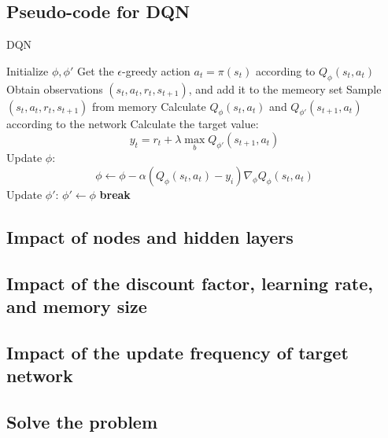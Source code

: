 \documentclass{article}
\begin{document}
\subsection{Pseudo-code for DQN}

\begin{algorithm}[h]
  \caption{DQN}
  \begin{algorithmic}[1]
    \State Initialize $\phi,\phi'$
        \State Get the $\epsilon$-greedy action $a_t=\pi(s_t)$ according to $Q_{\phi}(s_t,a_t)$
        \State Obtain observations $(s_t,a_t,r_t,s_{t+1})$, and add it to the memeory set
          \State Sample $(s_t,a_t,r_t,s_{t+1})$ from memory
          \State Calculate $Q_{\phi}(s_t,a_t)$ and $Q_{\phi'}(s_{t+1},a_t)$ according to the network
          \State Calculate the target value:
          $$y_t=r_t+\lambda\max_{b}Q_{\phi'}(s_{t+1},a_t)$$
          \State Update $\phi$:
          $$\phi\leftarrow\phi-\alpha(Q_{\phi}(s_t,a_t)-y_i)\nabla_{\phi}Q_{\phi}(s_t,a_t)$$
        \EndFor
      \EndFor
      \State Update $\phi'$: $\phi'\leftarrow\phi$
        \State \textbf{break}
      \EndIf
    \EndFor
  \end{algorithmic}
\end{algorithm}

\subsection{Impact of nodes and hidden layers}

\subsection{Impact of the discount factor, learning rate, and memory size}

\subsection{Impact of the update frequency of target network}

\subsection{Solve the problem}
\end{document}
